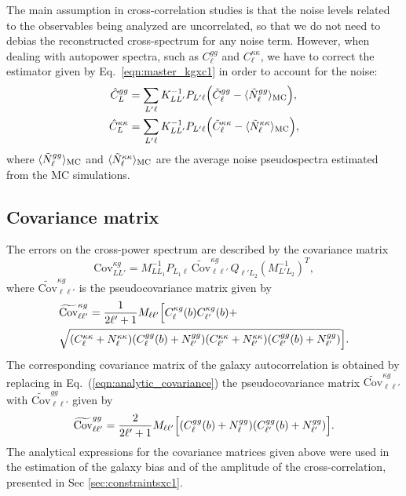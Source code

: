 The main assumption in cross-correlation studies is that the noise levels related to the observables being analyzed are uncorrelated, so that we do not need to debias the reconstructed cross-spectrum for any noise term. However, when dealing with autopower spectra, such as $C^{gg}_{\ell}$ and $C^{\kappa\kappa}_{\ell}$, we have to correct the estimator given by Eq.~\eqref{eqn:master_kgxc1} in order to account for the noise:
%
\begin{equation}
\begin{split}
\hat{C}^{gg}_{L} &= \sum_{L'\ell}K^{-1}_{LL'}P_{L'\ell}\Bigl( \tilde{C}^{gg}_{\ell} - \langle \tilde{N}^{gg}_{\ell}\rangle_{\rm{MC}} \Bigr), \\
\hat{C}^{\kappa\kappa}_{L} &= \sum_{L'\ell}K^{-1}_{LL'}P_{L'\ell}\Bigl( \tilde{C}^{\kappa\kappa}_{\ell} - \langle \tilde{N}^{\kappa\kappa}_{\ell}\rangle_{\rm{MC}} \Bigr),
\end{split}
\end{equation}
%
where $\langle \tilde{N}^{gg}_{\ell}\rangle_{\rm{MC}}$ and $\langle \tilde{N}^{\kappa\kappa}_{\ell}\rangle_{\rm{MC}}$ are the average noise pseudospectra estimated from the \gls{MC} simulations.

\subsection{Covariance matrix}\label{sec:covxc1}
The errors on the cross-power spectrum are described by the covariance matrix \citep{Brown2005}
%
\begin{equation}
\label{eqn:analytic_covariance}
 \text{Cov}^{\kappa g}_{LL'} = M_{LL_1}^{-1} P_{L_1\ell}\,\widetilde{\text{Cov}}^{\kappa g}_{\ell\ell'} \, Q_{\ell' L_2} (M_{L'L_2}^{-1})^T,
\end{equation}
%
where $\widetilde{\text{Cov}}^{\kappa g}_{\ell\ell'}$ is the pseudocovariance matrix given by
%
\begin{equation}
\begin{split}
\label{eqn:pcov_kg}
 &\widetilde{\text{Cov}}^{\kappa g}_{\ell\ell'}  =  \frac{1}{2\ell'+1}M_{\ell\ell'}\Bigl[ C_{\ell}^{\kappa g}(b)C_{\ell'}^{\kappa g}(b)+ \\
 & \sqrt{(C_{\ell}^{\kappa\kappa}+N_{\ell}^{\kappa\kappa})(C_{\ell}^{gg}(b) + N_{\ell'}^{gg})(C_{\ell'}^{\kappa\kappa}+N_{\ell'}^{\kappa\kappa})(C_{\ell'}^{gg}(b) + N_{\ell'}^{gg})}\Bigr].
\end{split}
\end{equation}
%
The corresponding covariance matrix of the galaxy autocorrelation is obtained by replacing in Eq.~(\eqref{eqn:analytic_covariance}) the pseudocovariance matrix $\widetilde{\text{Cov}}^{\kappa g}_{\ell\ell'}$ with  $\widetilde{\text{Cov}}^{gg}_{\ell\ell'}$ given by
%
\begin{equation}
\label{eqn:pcov_gg}
 \widetilde{\text{Cov}}^{gg}_{\ell\ell'} = \frac{2}{2\ell'+1}M_{\ell\ell'}\Bigl[(C_{\ell}^{gg}(b) + N_{\ell}^{gg})(C_{\ell'}^{gg}(b) + N_{\ell'}^{gg})\Bigr].
\end{equation}
%
The analytical expressions for the covariance matrices given above were used in the estimation of the galaxy bias and of the amplitude of the cross-correlation, presented in Sec \eqref{sec:constraintsxc1}.

